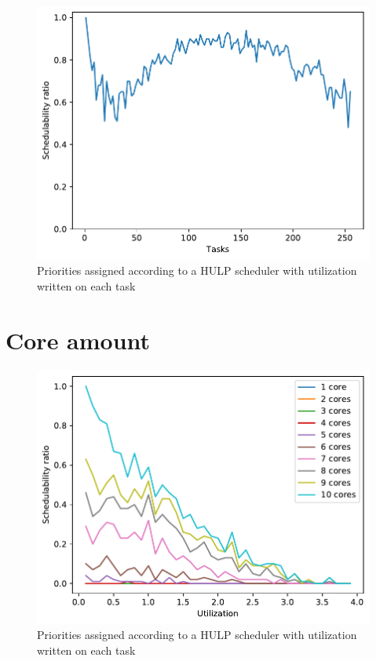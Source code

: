 \documentclass{kththesis}
\begin{document}
\begin{figure}[H]

    \centering

    \includegraphics[width=1.0\linewidth]{images/task_amount_1.pdf}

    \caption{Priorities assigned according to a HULP scheduler with utilization written on each task}

    \label{fig:task_amount_1}

\end{figure}


\section{Core amount}\label{sec:results_core_amount}

\begin{figure}[H]

    \centering

    \includegraphics[width=1.0\linewidth]{images/core_amounts.pdf}

    \caption{Priorities assigned according to a HULP scheduler with utilization written on each task}

    \label{fig:core_amounts}

\end{figure}
\end{document}

